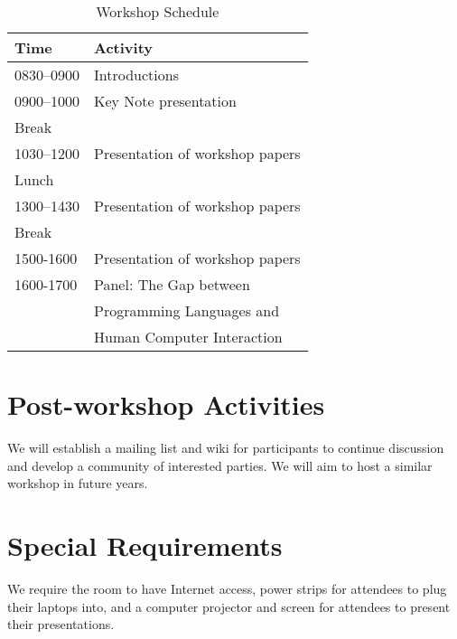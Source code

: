 \documentclass{acm_proc_article-sp}
\begin{document}
\begin{table} [!htbp] %
\caption{Workshop Schedule}
\begin{tabular}{|l|l|}
\hline \textbf{Time}   & \textbf{Activity}\\
\hline 0830--0900    & Introductions\\
\hline 0900--1000    & Key Note presentation\\
\hline Break              & \\
\hline 1030--1200   & Presentation of workshop papers\\
\hline Lunch             & \\
\hline 1300--1430   & Presentation of workshop papers\\
\hline Break              & \\
\hline 1500-1600    & Presentation of workshop papers\\
\hline 1600-1700    & Panel: The Gap between\\
                                   & Programming Languages and\\
                                    & Human Computer Interaction\\
\hline
\end{tabular}
\label{tab:schedule}
\end{table}

\section{Post-workshop Activities}

We will establish a mailing list and wiki for participants to continue discussion and develop a community of 
interested parties. We will aim to host a similar workshop in future years.

\section{Special Requirements}

We require the room to have Internet access, power strips for attendees to plug their laptops into, and a computer projector and screen for attendees to present their presentations.


 
\end{document}

